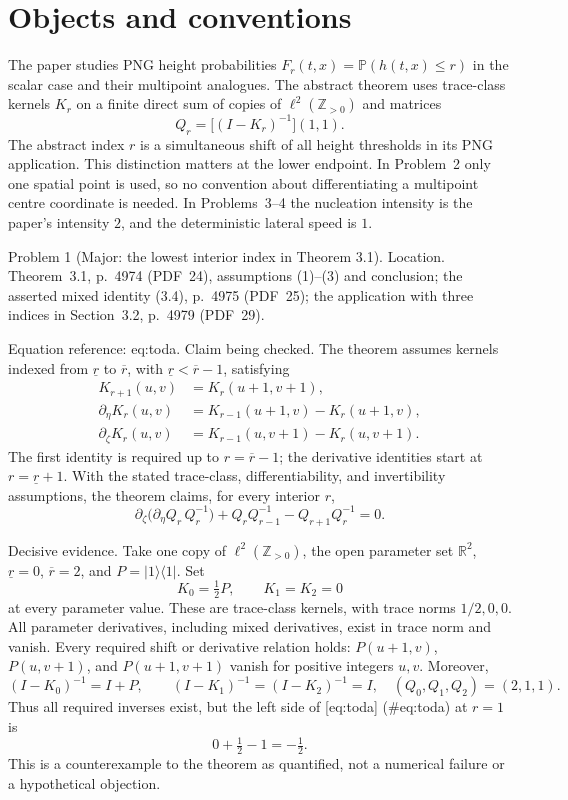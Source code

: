 \documentclass[10pt]{article}
\begin{document}
\section*{Objects and conventions}
The paper studies PNG height probabilities \(F_r(t,x)=\mathbb P(h(t,x)\leq r)\) in the scalar case and their multipoint analogues. The abstract theorem uses trace-class kernels \(K_r\) on a finite direct sum of copies of \(\ell^2(\mathbb Z_{>0})\) and matrices \[Q_r=\big[(I-K_r)^{-1}\big](1,1).\] The abstract index \(r\) is a simultaneous shift of all height thresholds in its PNG application. This distinction matters at the lower endpoint. In Problem 2 only one spatial point is used, so no convention about differentiating a multipoint centre coordinate is needed. In Problems 3–4 the nucleation intensity is the paper’s intensity \(2\), and the deterministic lateral speed is \(1\).\par
Problem 1 (Major: the lowest interior index in Theorem 3.1).  Location. Theorem 3.1, p. 4974 (PDF 24), assumptions (1)–(3) and conclusion; the asserted mixed identity (3.4), p. 4975 (PDF 25); the application with three indices in Section 3.2, p. 4979 (PDF 29).\par
Equation reference: eq:toda. Claim being checked. The theorem assumes kernels indexed from \(\underline r\) to \(\overline r\), with \(\underline r<\overline r-1\), satisfying \[\begin{aligned}
K_{r+1}(u,v)&=K_r(u+1,v+1),\\
\partial_\eta K_r(u,v)&=K_{r-1}(u+1,v)-K_r(u+1,v),\\
\partial_\zeta K_r(u,v)&=K_{r-1}(u,v+1)-K_r(u,v+1).\end{aligned}\] The first identity is required up to \(r=\overline r-1\); the derivative identities start at \(r=\underline r+1\). With the stated trace-class, differentiability, and invertibility assumptions, the theorem claims, for every interior \(r\), \[
\partial_\zeta\big(\partial_\eta Q_r\,Q_r^{-1}\big)
 +Q_rQ_{r-1}^{-1}-Q_{r+1}Q_r^{-1}=0.\]\par
Decisive evidence. Take one copy of \(\ell^2(\mathbb Z_{>0})\), the open parameter set \(\mathbb R^2\), \(\underline r=0\), \(\overline r=2\), and \(P=|1\rangle\langle1|\). Set \[K_0=\tfrac12P,\qquad K_1=K_2=0\] at every parameter value. These are trace-class kernels, with trace norms \(1/2,0,0\). All parameter derivatives, including mixed derivatives, exist in trace norm and vanish. Every required shift or derivative relation holds: \(P(u+1,v)\), \(P(u,v+1)\), and \(P(u+1,v+1)\) vanish for positive integers \(u,v\). Moreover, \[(I-K_0)^{-1}=I+P,\qquad (I-K_1)^{-1}=(I-K_2)^{-1}=I,
\quad (Q_0,Q_1,Q_2)=(2,1,1).\] Thus all required inverses exist, but the left side of [eq:toda] (\#eq:toda) at \(r=1\) is \[0+\tfrac12-1=-\tfrac12.\] This is a counterexample to the theorem as quantified, not a numerical failure or a hypothetical objection.\par
\end{document}

